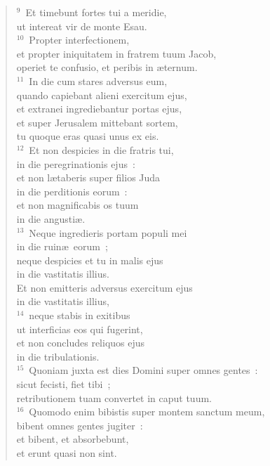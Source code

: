 \begin{flushleft}
\begin{verse}
${}^{9}$~Et timebunt fortes tui a meridie,\\ ut intereat vir de monte Esau.\\
${}^{10}$~Propter interfectionem,\\ et propter iniquitatem in fratrem tuum Jacob,\\ operiet te confusio, et peribis in \ae ternum.\\
${}^{11}$~In die cum stares adversus eum,\\ quando capiebant alieni exercitum ejus,\\ et extranei ingrediebantur portas ejus,\\ et super Jerusalem mittebant sortem,\\ tu quoque eras quasi unus ex eis.\\
${}^{12}$~Et non despicies in die fratris tui,\\ in die peregrinationis ejus~:\\ et non l\ae taberis super filios Juda\\ in die perditionis eorum~:\\ et non magnificabis os tuum\\ in die angusti\ae .\\
${}^{13}$~Neque ingredieris portam populi mei\\ in die ruin\ae\ eorum~;\\ neque despicies et tu in malis ejus\\ in die vastitatis illius.\\ Et non emitteris adversus exercitum ejus\\ in die vastitatis illius,\\
${}^{14}$~neque stabis in exitibus\\ ut interficias eos qui fugerint,\\ et non concludes reliquos ejus\\ in die tribulationis.\\
${}^{15}$~Quoniam juxta est dies Domini super omnes gentes~:\\ sicut fecisti, fiet tibi~;\\ retributionem tuam convertet in caput tuum.\\
${}^{16}$~Quomodo enim bibistis super montem sanctum meum,\\ bibent omnes gentes jugiter~:\\ et bibent, et absorbebunt,\\ et erunt quasi non sint.



\end{verse}
\end{flushleft}

